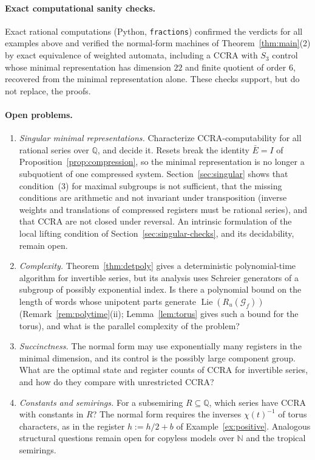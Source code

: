 \documentclass[acmlarge,screen,11pt,nonacm,natbib=false]{acmart}
\newcommand{\Q}{\mathbb{Q}}
\newcommand{\N}{\mathbb{N}}
\newcommand{\cG}{\mathcal{G}}
\theoremstyle{definition}
\begin{document}
\paragraph{Exact computational sanity checks.}
Exact rational computations (Python, \texttt{fractions}) confirmed the verdicts for all examples above and verified the normal-form machines of Theorem~\ref{thm:main}(2) by exact equivalence of weighted automata, including a CCRA with $S_3$ control whose minimal representation has dimension $22$ and finite quotient of order $6$, recovered from the minimal representation alone. These checks support, but do not replace, the proofs.

\paragraph{Open problems.}
\begin{enumerate}
\item \emph{Singular minimal representations.} Characterize CCRA-computability for all rational series over $\Q$, and decide it. Resets break the identity $\bar E=I$ of Proposition~\ref{prop:compression}, so the minimal representation is no longer a subquotient of one compressed system. Section~\ref{sec:singular} shows that condition~(3) for maximal subgroups is not sufficient, that the missing conditions are arithmetic and not invariant under transposition (inverse weights and translations of compressed registers must be rational series), and that CCRA are not closed under reversal. An intrinsic formulation of the local lifting condition of Section~\ref{sec:singular-checks}, and its decidability, remain open.
\item \emph{Complexity.} Theorem~\ref{thm:detpoly} gives a deterministic polynomial-time algorithm for invertible series, but its analysis uses Schreier generators of a subgroup of possibly exponential index. Is there a polynomial bound on the length of words whose unipotent parts generate $\operatorname{Lie}(R_u(\cG_f))$ (Remark~\ref{rem:polytime}(ii); Lemma~\ref{lem:torus} gives such a bound for the torus), and what is the parallel complexity of the problem?
\item \emph{Succinctness.} The normal form may use exponentially many registers in the minimal dimension, and its control is the possibly large component group. What are the optimal state and register counts of CCRA for invertible series, and how do they compare with unrestricted CCRA?
\item \emph{Constants and semirings.} For a subsemiring $R\subseteq\Q$, which series have CCRA with constants in $R$? The normal form requires the inverses $\chi(t)^{-1}$ of torus characters, as in the register $h:=h/2+b$ of Example~\ref{ex:positive}. Analogous structural questions remain open for copyless models over $\N$ and the tropical semirings.
\end{enumerate}
\end{document}

